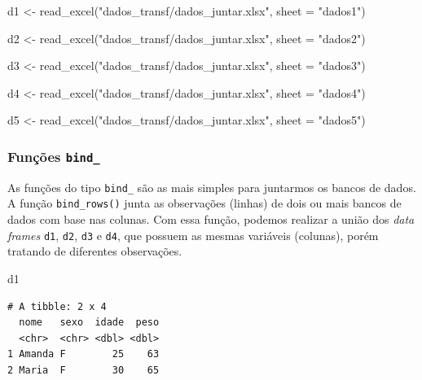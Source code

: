 \documentclass[
  brazilian,
]{book}
\newenvironment{Shaded}{\begin{snugshade}}{\end{snugshade}}
\newcommand{\AttributeTok}[1]{\textcolor[rgb]{0.77,0.63,0.00}{#1}}
\newcommand{\FunctionTok}[1]{\textcolor[rgb]{0.00,0.00,0.00}{#1}}
\newcommand{\NormalTok}[1]{#1}
\newcommand{\OtherTok}[1]{\textcolor[rgb]{0.56,0.35,0.01}{#1}}
\newcommand{\StringTok}[1]{\textcolor[rgb]{0.31,0.60,0.02}{#1}}
\begin{document}
\begin{Shaded}
\begin{Highlighting}[]
\NormalTok{d1 }\OtherTok{\textless{}{-}} \FunctionTok{read\_excel}\NormalTok{(}\StringTok{"dados\_transf/dados\_juntar.xlsx"}\NormalTok{, }\AttributeTok{sheet =} \StringTok{"dados1"}\NormalTok{)}

\NormalTok{d2 }\OtherTok{\textless{}{-}} \FunctionTok{read\_excel}\NormalTok{(}\StringTok{"dados\_transf/dados\_juntar.xlsx"}\NormalTok{, }\AttributeTok{sheet =} \StringTok{"dados2"}\NormalTok{)}

\NormalTok{d3 }\OtherTok{\textless{}{-}} \FunctionTok{read\_excel}\NormalTok{(}\StringTok{"dados\_transf/dados\_juntar.xlsx"}\NormalTok{, }\AttributeTok{sheet =} \StringTok{"dados3"}\NormalTok{)}

\NormalTok{d4 }\OtherTok{\textless{}{-}} \FunctionTok{read\_excel}\NormalTok{(}\StringTok{"dados\_transf/dados\_juntar.xlsx"}\NormalTok{, }\AttributeTok{sheet =} \StringTok{"dados4"}\NormalTok{)}

\NormalTok{d5 }\OtherTok{\textless{}{-}} \FunctionTok{read\_excel}\NormalTok{(}\StringTok{"dados\_transf/dados\_juntar.xlsx"}\NormalTok{, }\AttributeTok{sheet =} \StringTok{"dados5"}\NormalTok{)}
\end{Highlighting}
\end{Shaded}

\hypertarget{funuxe7uxf5es-bind_}{%
\subsubsection*{\texorpdfstring{Funções \texttt{bind\_}}{Funções bind\_}}\label{funuxe7uxf5es-bind_}}

As funções do tipo \texttt{bind\_} são as mais simples para juntarmos os bancos de dados. A função \texttt{bind\_rows()} junta as observações (linhas) de dois ou mais bancos de dados com base nas colunas. Com essa função, podemos realizar a união dos \emph{data frames} \texttt{d1}, \texttt{d2}, \texttt{d3} e \texttt{d4}, que possuem as mesmas variáveis (colunas), porém tratando de diferentes observações.

\begin{Shaded}
\begin{Highlighting}[]
\NormalTok{d1}
\end{Highlighting}
\end{Shaded}

\begin{verbatim}
# A tibble: 2 x 4
  nome   sexo  idade  peso
  <chr>  <chr> <dbl> <dbl>
1 Amanda F        25    63
2 Maria  F        30    65
\end{verbatim}
\end{document}
